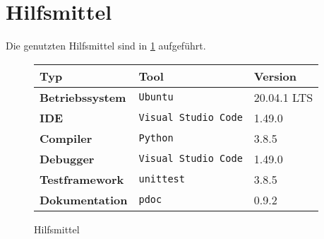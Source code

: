 \section{Hilfsmittel}
\label{sec:hilfsmittel}

Die genutzten Hilfsmittel sind in \ref{tab:tools} aufgeführt.

\begin{figure}[H]
    \centering
    \begin{tabular}{|l|l|l|}
        \hline
        \textbf{Typ}            & \textbf{Tool}               & \textbf{Version} \\
        \hline
        \hline
        \textbf{Betriebssystem} & \texttt{Ubuntu}             & 20.04.1 LTS      \\
        \hline
        \textbf{IDE}            & \texttt{Visual Studio Code} & 1.49.0           \\
        \hline
        \textbf{Compiler}       & \texttt{Python}             & 3.8.5            \\
        \hline
        \textbf{Debugger}       & \texttt{Visual Studio Code} & 1.49.0           \\
        \hline
        \textbf{Testframework}  & \texttt{unittest}           & 3.8.5            \\
        \hline
        \textbf{Dokumentation}  & \texttt{pdoc}               & 0.9.2            \\
        \hline
    \end{tabular}
    \caption{Hilfsmittel}
    \label{tab:tools}
\end{figure}